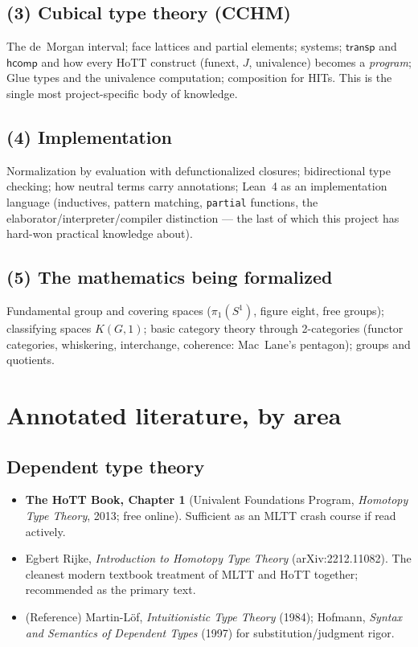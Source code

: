 \documentclass[11pt]{article}
\newcommand{\op}[1]{\ensuremath{\mathsf{#1}}}
\begin{document}
\subsection*{(3) Cubical type theory (CCHM)}
The de~Morgan interval; face lattices and partial elements; systems;
$\op{transp}$ and $\op{hcomp}$ and how every HoTT construct (funext,
$J$, univalence) becomes a \emph{program}; Glue types and the univalence
computation; composition for HITs.  This is the single most
project-specific body of knowledge.

\subsection*{(4) Implementation}
Normalization by evaluation with defunctionalized closures; bidirectional
type checking; how neutral terms carry annotations; Lean~4 as an
implementation language (inductives, pattern matching, \texttt{partial}
functions, the elaborator/interpreter/compiler distinction --- the last
of which this project has hard-won practical knowledge about).

\subsection*{(5) The mathematics being formalized}
Fundamental group and covering spaces ($\pi_1(S^1)$, figure eight, free
groups); classifying spaces $K(G,1)$; basic category theory through
2-categories (functor categories, whiskering, interchange, coherence:
Mac~Lane's pentagon); groups and quotients.

\section{Annotated literature, by area}

\subsection{Dependent type theory}
\begin{itemize}[leftmargin=1.5em]
\item \textbf{The HoTT Book, Chapter 1} (Univalent Foundations Program,
\emph{Homotopy Type Theory}, 2013; free online).  Sufficient as an MLTT
crash course if read actively.
\item Egbert Rijke, \emph{Introduction to Homotopy Type Theory}
(arXiv:2212.11082).  The cleanest modern textbook treatment of MLTT and
HoTT together; recommended as the primary text.
\item (Reference) Martin-L\"of, \emph{Intuitionistic Type Theory} (1984);
Hofmann, \emph{Syntax and Semantics of Dependent Types} (1997) for
substitution/judgment rigor.
\end{itemize}
\end{document}
